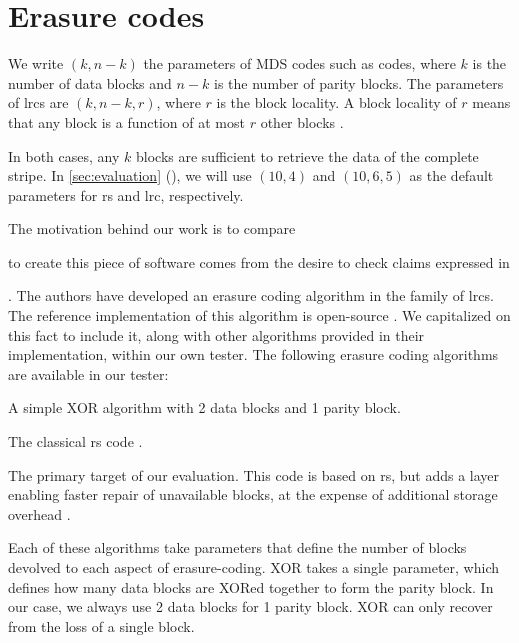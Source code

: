 \section{Erasure codes}

\label{sec:codes}

We write $(k,n-k)$ the parameters of MDS codes such as  codes, where $k$ is the number of data blocks and $n-k$ is the number of parity blocks. The parameters of \acp{lrc} are $(k,n-k,r)$, where $r$ is the block locality. A block locality of $r$ means that any block is a function of at most $r$ other blocks \autocite{XorbasVLDB}.



In both cases, any $k$ blocks are sufficient to retrieve the data of the complete stripe.
In \autoref{sec:evaluation} (), we will use $(10,4)$ and $(10,6,5)$ as the default parameters for \ac{rs} and \ac{lrc}, respectively.



The motivation behind our work is to compare 

to create this piece of software comes from the desire to check claims expressed in 


 \autocite{XorbasVLDB}.
The authors have developed an erasure coding algorithm in the family of \acfp{lrc}.
The reference implementation of this algorithm is open-source \autocite{xorbas-github}.
We capitalized on this fact to include it, along with other algorithms provided in their implementation, within our own tester.
The following erasure coding algorithms are available in our tester:
\begin{description}
\item[XOR] A simple XOR algorithm with 2 data blocks and 1 parity block.
\item[\acs{rs}] The classical \acf{rs} code \autocite{reed-solomon}.
\item[\acs{lrc}] The primary target of our evaluation. This code is based on \ac{rs}, but adds a layer enabling faster repair of unavailable blocks, at the expense of additional storage overhead \autocite{XorbasVLDB}.
\end{description}


Each of these algorithms take parameters that define the number of blocks devolved to each aspect of erasure-coding.
XOR takes a single parameter, which defines how many data blocks are XORed together to form the parity block.
In our case, we always use 2 data blocks for 1 parity block.
XOR can only recover from the loss of a single block.


